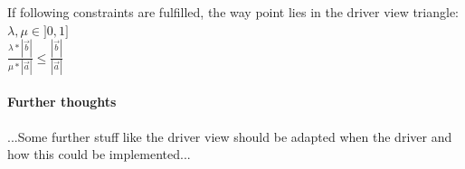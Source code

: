 \noindent If following constraints are fulfilled, the way point lies in the driver
view triangle: \\

$ \lambda, \mu \in ]0, 1]$ \\

$ \frac{\lambda * \left| \vec{b} \right| }{\mu * \left| \vec{a} \right|} \leq 
\frac{\left| \vec{b} \right|}{\left| \vec{a} \right|}$

\paragraph{Further thoughts}
...Some further stuff like the driver view should be adapted when the driver
and how this could be implemented...
